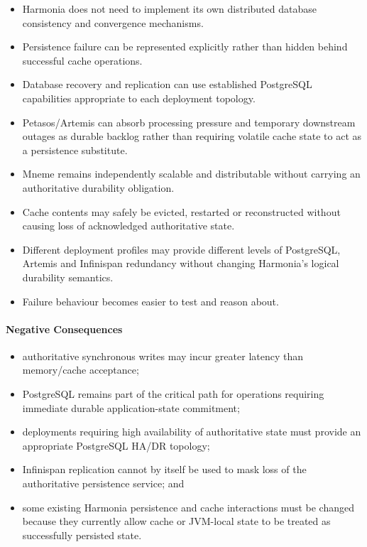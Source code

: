 \begin{itemize}
    \item Harmonia does not need to implement its own distributed database consistency and convergence mechanisms.
    \item Persistence failure can be represented explicitly rather than hidden behind successful cache operations.
    \item Database recovery and replication can use established PostgreSQL capabilities appropriate to each deployment topology.
    \item Petasos/Artemis can absorb processing pressure and temporary downstream outages as durable backlog rather than requiring volatile cache state to act as a persistence substitute.
    \item Mneme remains independently scalable and distributable without carrying an authoritative durability obligation.
    \item Cache contents may safely be evicted, restarted or reconstructed without causing loss of acknowledged authoritative state.
    \item Different deployment profiles may provide different levels of PostgreSQL, Artemis and Infinispan redundancy without changing Harmonia's logical durability semantics.
    \item Failure behaviour becomes easier to test and reason about.
\end{itemize}

\paragraph{Negative Consequences}

\begin{itemize}
    \item authoritative synchronous writes may incur greater latency than memory/cache acceptance;
    \item PostgreSQL remains part of the critical path for operations requiring immediate durable application-state commitment;
    \item deployments requiring high availability of authoritative state must provide an appropriate PostgreSQL HA/DR topology;
    \item Infinispan replication cannot by itself be used to mask loss of the authoritative persistence service; and
    \item some existing Harmonia persistence and cache interactions must be changed because they currently allow cache or JVM-local state to be treated as successfully persisted state.
\end{itemize}

